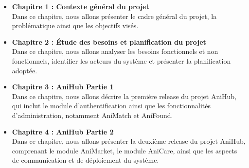\begin{itemize}

\item \textbf{Chapitre 1 : Contexte général du projet} \\
Dans ce chapitre, nous allons présenter le cadre général du projet, la problématique ainsi que les objectifs visés.

\item \textbf{Chapitre 2 : Étude des besoins et planification du projet} \\
Dans ce chapitre, nous allons analyser les besoins fonctionnels et non fonctionnels, identifier les acteurs du système et présenter la planification adoptée.

\item \textbf{Chapitre 3 : AniHub Partie 1} \\
Dans ce chapitre, nous allons décrire la première release du projet AniHub, qui inclut le module d’authentification ainsi que les fonctionnalités d’administration, notamment AniMatch et AniFound.

\item \textbf{Chapitre 4 : AniHub Partie 2} \\
Dans ce chapitre, nous allons présenter la deuxième release du projet AniHub, comprenant le module AniMarket, le module AniCare, ainsi que les aspects de communication et de déploiement du système.

\end{itemize}